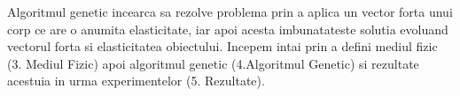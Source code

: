 Algoritmul genetic incearca sa rezolve problema prin a aplica un vector forta unui corp ce are o anumita elasticitate, iar apoi acesta imbunatateste solutia evoluand vectorul forta si elasticitatea obiectului. Incepem intai prin a defini mediul fizic (3. Mediul Fizic) apoi algoritmul genetic (4.Algoritmul Genetic) si rezultate acestuia in urma experimentelor (5. Rezultate).